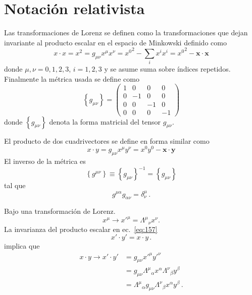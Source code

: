 \section{Notación relativista}
\label{sec:srn}
\begin{frame}
Las transformaciones de Lorenz se definen como la transformaciones que dejan invariante al producto escalar en el espacio de Minkowski definido como
\begin{equation}
  \label{eq:146}
 x\cdot x= x^2=g_{\mu\nu}x^\mu x^\nu={x^0}^2-\sum_i x^i x^i={x^0}^2-\mathbf{x}\cdot\mathbf{x}
\end{equation}
donde $\mu,\nu=0,1,2,3$, $i=1,2,3$ y se asume suma sobre índices repetidos.
Finalmente la métrica usada se define como
\begin{equation}
  \label{eq:gmunu}
  \left\{ g_{\mu\nu} \right\}=
  \begin{pmatrix}
    1&0&0&0\\
    0&-1&0&0\\
    0&0&-1&0\\
    0&0&0&-1
  \end{pmatrix}
\end{equation}
donde $\left\{ g_{\mu\nu} \right\}$ denota la forma matricial del tensor $g_{\mu\nu}$.  



El producto de dos cuadrivectores se define en forma similar como
\begin{equation}
\label{eq:157}
  x\cdot y=g_{\mu\nu}x^\mu y^\nu=x^0y^0-\mathbf{x}\cdot\mathbf{y}
\end{equation}
El inverso de la métrica es
\begin{equation}
  \left\{ g^{\mu\nu} \right\}\equiv\left\{ g_{\mu\nu} \right\}^{-1}=\left\{ g_{\mu\nu} \right\}
\end{equation}
tal que
\begin{equation}
  g^{\mu\alpha}g_{\alpha\nu}=\delta^\mu_\nu\,.
\end{equation}

Bajo una transformación de Lorenz.
\begin{equation}
  \label{eq:xx5}
  x^\mu\to {x'}^\mu={\Lambda^\mu}_{\nu}x^\nu.
\end{equation}
La invarianza del producto escalar en ec.~\eqref{eq:157}
\begin{equation}
  {x'}\cdot {y'}=x\cdot y\,.
\end{equation}
implica que
\begin{align}
\label{eq:Lambdasteps}
{x}\cdot{y}\to  {x'}\cdot{y'}&=g_{\mu\nu}{x'}^\mu{y'}^{\nu}\nonumber\\
  &=g_{\mu\nu}{\Lambda^{\mu}}_{\alpha}x^{\alpha}{\Lambda^{\nu}}_{\beta}y^{\beta}\nonumber\\
 &={\Lambda^{\mu}}_{\alpha}g_{\mu\nu}{\Lambda^{\nu}}_{\beta}x^{\alpha}y^{\beta}\,.
\end{align}


\end{frame}
